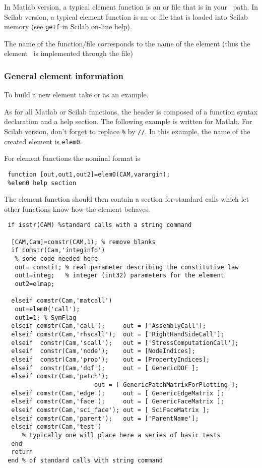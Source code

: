 In Matlab version, a typical element function is an  or  file that is in your \matlab\ path. In Scilab version, a typical element function is an  or  file that is loaded into Scilab memory (see {\tt getf} in Scilab on-line help).

The name of the function/file corresponds to the name of the element (thus the element \bare\ is implemented through the  file)

\subsubsection{General element information \label{elementinfo}}

To build a new element take  or  as an example.

  As for all Matlab or Scilab functions, the header is composed 
of a function syntax declaration and a help section. The following example is written for Matlab. For Scilab version, don't forget to replace \verb+%+ by {\tt //}. In this example, the name of the created element is {\tt elem0}. 

For element functions the nominal format is

\begin{verbatim}
 function [out,out1,out2]=elem0(CAM,varargin);
 %elem0 help section
\end{verbatim}

The element function should then contain a section for standard calls which let other functions know how the element behaves.

\begin{verbatim}
 if isstr(CAM) %standard calls with a string command

  [CAM,Cam]=comstr(CAM,1); % remove blanks
  if comstr(Cam,'integinfo')
   % some code needed here
   out= constit; % real parameter describing the constitutive law
   out1=integ;   % integer (int32) parameters for the element
   out2=elmap;   

  elseif comstr(Cam,'matcall')
   out=elem0('call');
   out1=1; % SymFlag
  elseif comstr(Cam,'call');     out = ['AssemblyCall'];
  elseif comstr(Cam,'rhscall');  out = ['RightHandSideCall'];
  elseif  comstr(Cam,'scall');   out = ['StressComputationCall'];
  elseif  comstr(Cam,'node');    out = [NodeIndices]; 
  elseif  comstr(Cam,'prop');    out = [PropertyIndices]; 
  elseif  comstr(Cam,'dof');     out = [ GenericDOF ];
  elseif comstr(Cam,'patch');    
                         out = [ GenericPatchMatrixForPlotting ];
  elseif comstr(Cam,'edge');     out = [ GenericEdgeMatrix ];
  elseif comstr(Cam,'face');     out = [ GenericFaceMatrix ];
  elseif comstr(Cam,'sci_face'); out = [ SciFaceMatrix ];
  elseif comstr(Cam,'parent');   out = ['ParentName'];
  elseif comstr(Cam,'test')
     % typically one will place here a series of basic tests
  end
  return
 end % of standard calls with string command

\end{verbatim}

